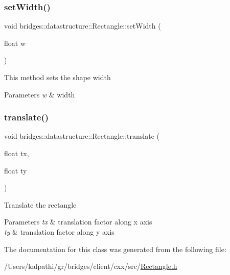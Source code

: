\mbox{\label{classbridges_1_1datastructure_1_1_rectangle_a7f6182e74816a6c7cf83ae49d5ed55be}} 
\subsubsection{\texorpdfstring{set\+Width()}{setWidth()}}
{\footnotesize\ttfamily void bridges\+::datastructure\+::\+Rectangle\+::set\+Width (\begin{DoxyParamCaption}\item[{float}]{w }\end{DoxyParamCaption})\hspace{0.3cm}{\ttfamily [inline]}}

This method sets the shape width


\begin{DoxyParams}{Parameters}
{\em w} & width \\
\hline
\end{DoxyParams}
\mbox{\label{classbridges_1_1datastructure_1_1_rectangle_a910c2a92c38e2e13bde3f1fd51b17316}} 
\subsubsection{\texorpdfstring{translate()}{translate()}}
{\footnotesize\ttfamily void bridges\+::datastructure\+::\+Rectangle\+::translate (\begin{DoxyParamCaption}\item[{float}]{tx,  }\item[{float}]{ty }\end{DoxyParamCaption})\hspace{0.3cm}{\ttfamily [inline]}}

Translate the rectangle


\begin{DoxyParams}{Parameters}
{\em tx} & translation factor along x axis \\
\hline
{\em ty} & translation factor along y axis \\
\hline
\end{DoxyParams}


The documentation for this class was generated from the following file\+:\begin{DoxyCompactItemize}
\item 
/\+Users/kalpathi/gr/bridges/client/cxx/src/\mbox{\hyperlink{_rectangle_8h}{Rectangle.\+h}}\end{DoxyCompactItemize}
